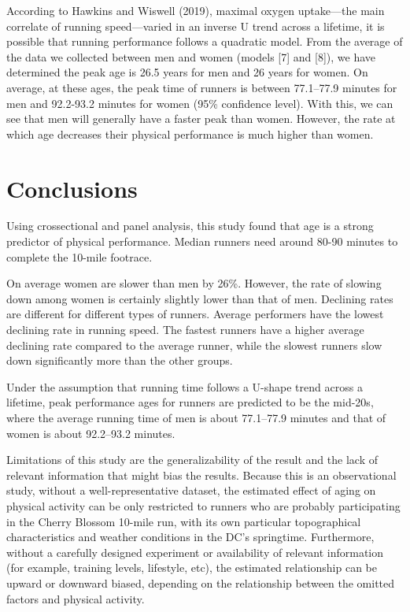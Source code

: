 \documentclass[12pt]{article}
\begin{document}


According to Hawkins and Wiswell (2019), maximal oxygen uptake---the main
correlate of running speed---varied in an inverse U trend across a lifetime,
it is possible that running performance follows a quadratic model.
From the average of the data we collected between men and women
(models [7] and [8]),
we have determined the peak age is 26.5 years for men and 26 years for women.
On average, at these ages, the peak time of runners is between 77.1--77.9
minutes for men and 92.2-93.2 minutes for women (95\% confidence level).
With this, we can see that men will generally have a faster peak than women.
However, the rate at which age decreases their physical performance is much
higher than women.


\section*{Conclusions}

Using crossectional and panel analysis, this study found that age is a
strong predictor of physical performance.
Median runners need around 80-90 minutes to complete the 10-mile footrace.

On average women are slower than men by 26\%.
However, the rate of slowing down among women is certainly slightly lower
than that of men. Declining rates are different for different types of runners.
Average performers have the lowest declining rate in running speed.
The fastest runners have a higher average declining rate compared to the
average runner, while the slowest runners slow down significantly more than
the other groups.

Under the assumption that running time follows a U-shape trend across a
lifetime, peak performance ages for runners are predicted to be the mid-20s,
where the average running time of men is about 77.1--77.9 minutes and that of
women is about 92.2--93.2 minutes.

Limitations of this study are the generalizability of the result and the lack of relevant information that might bias the results. Because this is an observational study, without a well-representative dataset, the estimated effect of aging on physical activity can be only restricted to runners who are probably participating in the Cherry Blossom 10-mile run, with its own particular topographical characteristics and weather conditions in the DC’s springtime. Furthermore, without a carefully designed experiment or availability of relevant information (for example, training levels, lifestyle, etc), the estimated relationship can be upward or downward biased, depending on the relationship between the omitted factors and physical activity.
\end{document}
